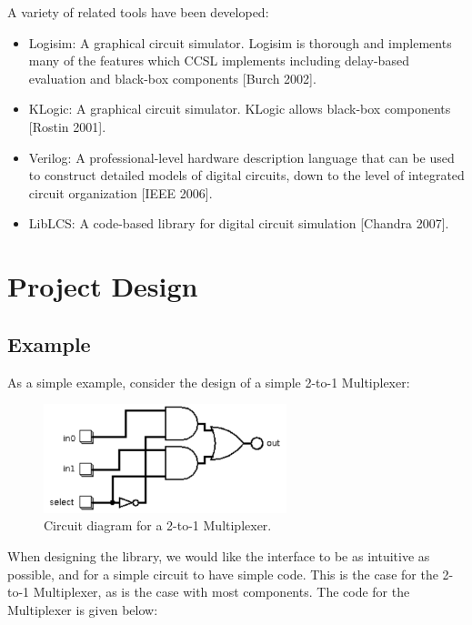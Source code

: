 \documentclass{article}
\begin{document}
A variety of related tools have been developed:

\begin{itemize}

\item Logisim: A graphical circuit simulator. Logisim is thorough and implements many of the features which CCSL implements including delay-based evaluation and black-box components [Burch 2002].

\item KLogic: A graphical circuit simulator. KLogic allows black-box components [Rostin 2001].

\item Verilog: A professional-level hardware description language that can be used to construct detailed models of digital circuits, down to the level of integrated circuit organization [IEEE 2006].

\item LibLCS: A code-based library for digital circuit simulation [Chandra 2007].

\end{itemize}

\section{Project Design}

\subsection{Example}

As a simple example, consider the design of a simple 2-to-1 Multiplexer:

\begin{figure}[H]
    \begin{center}
        \includegraphics[angle=0,width=200pt]{imgs/Mux.pdf}
    \end{center}
    \caption{Circuit diagram for a 2-to-1 Multiplexer.}
\end{figure}

When designing the library, we would like the interface to be as intuitive as possible, and for a simple circuit to have simple code. This is the case for the 2-to-1 Multiplexer, as is the case with most components. The code for the Multiplexer is given below:
\end{document}
